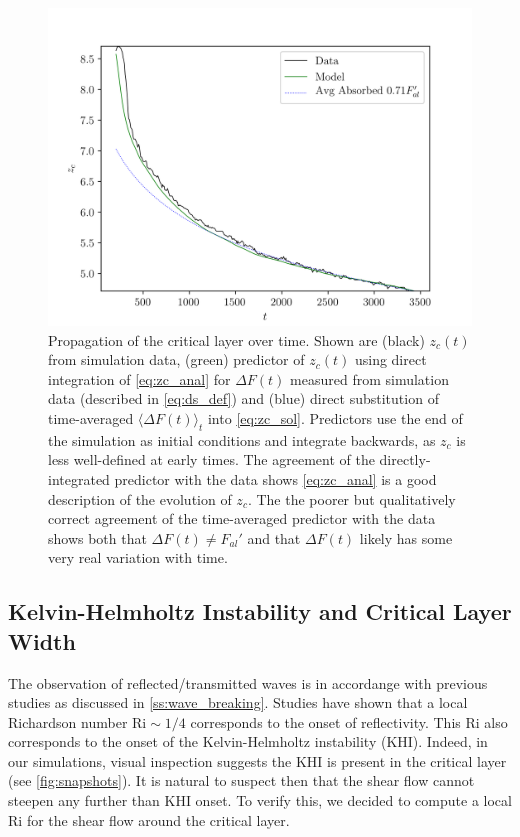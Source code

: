 \documentclass[
        fleqn,
        usenatbib,
    ]{mnras}
\newcommand*{\ev}[1]{\langle#1\rangle}
\begin{document}
\begin{figure}
    \centering
    \includegraphics[width=\columnwidth]{plots/nl_front.png}
    \caption{Propagation of the critical layer over time. Shown are (black)
    $z_c(t)$ from simulation data, (green) predictor of $z_c(t)$ using direct
    integration of \autoref{eq:zc_anal} for $\Delta F(t)$ measured from
    simulation data (described in \autoref{eq:ds_def}) and (blue) direct
    substitution of time-averaged $\ev{\Delta F(t)}_t$ into
    \autoref{eq:zc_sol}. Predictors use the end of the simulation as initial
    conditions and integrate backwards, as $z_c$ is less well-defined at early
    times. The agreement of the directly-integrated predictor with the data
    shows \autoref{eq:zc_anal} is a good description of the evolution of $z_c$.
    The the poorer but qualitatively correct agreement of the time-averaged
    predictor with the data shows both that $\Delta F(t) \neq F_{al}'$ and that
    $\Delta F(t)$ likely has some very real variation with
    time.}\label{fig:nl_front}
\end{figure}

\subsection{Kelvin-Helmholtz Instability and Critical Layer Width}\label{ss:khi}

The observation of reflected/transmitted waves is in accordange with previous
studies as discussed in \autoref{ss:wave_breaking}. Studies have shown that a
local Richardson number $\mathrm{Ri} \sim 1/4$ corresponds to the onset of
reflectivity. This $\mathrm{Ri}$ also corresponds to the onset of the
Kelvin-Helmholtz instability (KHI). Indeed, in our simulations, visual
inspection suggests the KHI is present in the critical layer (see
\autoref{fig:snapshots}). It is natural to suspect then that the shear flow
cannot steepen any further than KHI onset. To verify this, we decided to compute
a local $\mathrm{Ri}$ for the shear flow around the critical layer.
\end{document}
